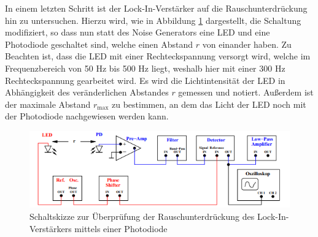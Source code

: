 In einem letzten Schritt ist der Lock-In-Verstärker auf die Rauschunterdrückung hin zu untersuchen.
Hierzu wird, wie in Abbildung \ref{fig:aufbau2} dargestellt, die Schaltung modifiziert, so dass nun statt des Noise Generators eine LED und eine Photodiode geschaltet sind, welche einen Abstand $r$ von einander haben.
Zu Beachten ist, dass die LED mit einer Rechteckspannung versorgt wird, welche im Frequenzbereich von 50 Hz bis 500 Hz
liegt, weshalb hier mit einer 300 Hz Rechteckspannung gearbeitet wird. Es wird die Lichtintensität der LED in Abhängigkeit des veränderlichen Abstandes $r$ gemessen und notiert. Außerdem ist der maximale Abstand 
$r_\text{max}$ zu bestimmen, an dem das Licht der LED noch mit der Photodiode nachgewiesen werden kann.
\begin{figure}
  \centering
  \includegraphics{content/abbildung3.png}
  \caption{Schaltskizze zur Überprüfung der Rauschunterdrückung des Lock-In-Verstärkers mittels einer Photodiode \cite[5]{V303}}
  \label{fig:aufbau2}
\end{figure}